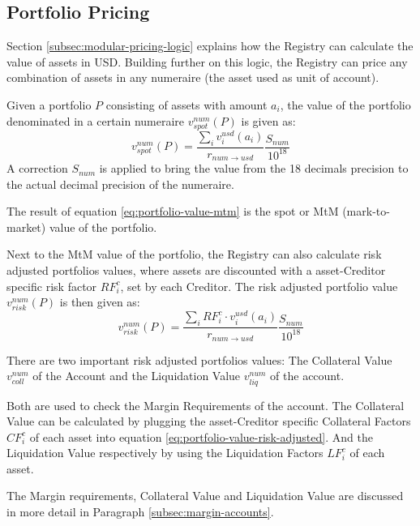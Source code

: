 \documentclass[sigconf,nonacm]{acmart}
\begin{document}
\subsection{Portfolio Pricing}
\label{subsec:portfolio-pricing}
Section \ref{subsec:modular-pricing-logic} explains how the Registry can calculate the value of assets in USD.
Building further on this logic, the Registry can price any combination of assets in any numeraire (the asset used as unit of account).

Given a portfolio $P$ consisting of assets with amount $a_{i}$, the value of the portfolio denominated in a certain numeraire $v_{spot}^{num}(P)$ is given as:
\begin{equation}
    \label{eq:portfolio-value-mtm}
    v_{spot}^{num}(P) = \frac{\sum_{i}{v^{usd}_{i}(a_{i})}}{r_{num\rightarrow usd}}\frac{S_{num}}{10^{18}}
\end{equation}
A correction $S_{num}$ is applied to bring the value from the 18 decimals precision to the actual decimal precision of the numeraire.

The result of equation \ref{eq:portfolio-value-mtm} is the spot or MtM (mark-to-market) value of the portfolio.

Next to the MtM value of the portfolio, the Registry can also calculate risk adjusted portfolios values,
where assets are discounted with a asset-Creditor specific risk factor $RF_{i}^{c}$, set by each Creditor.
The risk adjusted portfolio value $v_{risk}^{num}(P)$ is then given as:
\begin{equation}
    \label{eq:portfolio-value-risk-adjusted}
    v_{risk}^{num}(P) = \frac{\sum_{i}{RF_{i}^{c} \cdot v^{usd}_{i}(a_{i})}}{r_{num\rightarrow usd}}\frac{S_{num}}{10^{18}}
\end{equation}

There are two important risk adjusted portfolios values: The Collateral Value $v_{coll}^{num}$ of the Account and the Liquidation Value $v_{liq}^{num}$ of the account.

Both are used to check the Margin Requirements of the account.
The Collateral Value can be calculated by plugging the asset-Creditor specific Collateral Factors $CF_{i}^{c}$ of each asset into equation \ref{eq:portfolio-value-risk-adjusted}.
And the Liquidation Value respectively by using the Liquidation Factors $LF_{i}^{c}$ of each asset.

The Margin requirements, Collateral Value and Liquidation Value are discussed in more detail in Paragraph \ref{subsec:margin-accounts}.
\end{document}
